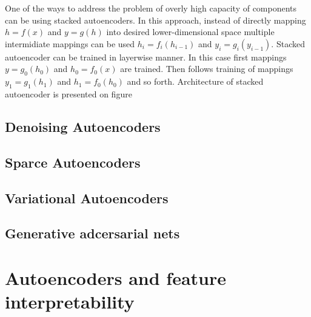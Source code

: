 One of the ways to address the problem of overly high capacity of components can be using stacked autoencoders.
In this approach, instead of directly mapping $h=f(x)$ and $y=g(h)$ into desired lower-dimensional space multiple intermidiate mappings can be used $h_i=f_i(h_{i-1})$ and $y_i=g_i(y_{i-1})$.
Stacked autoencoder can be trained in layerwise manner.
In this case first mappings $y=g_0(h_0)$ and $h_0=f_0(x)$ are trained.
Then follows training of mappings $y_1=g_1(h_1)$ and $h_1=f_0(h_0)$ and so forth.
Architecture of stacked autoencoder is presented on figure



\subsection{Denoising Autoencoders}\label{cha:dae}



\subsection{Sparce Autoencoders}\label{cha:sae}
\subsection{Variational Autoencoders}\label{cha:vae}
\subsection{Generative adcersarial nets}\label{cha:gan}
\section{Autoencoders and feature interpretability}
